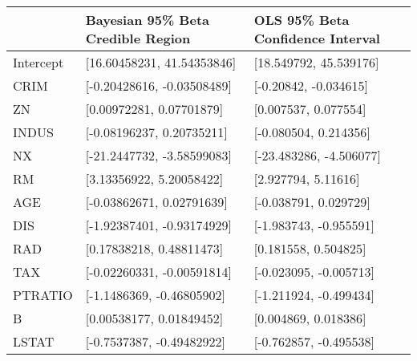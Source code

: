 \begin{tabular}{lll}
\hline
           & Bayesian 95\% Beta Credible Region   & OLS 95\% Beta Confidence Interval   \\
\hline
 Intercept & [16.60458231, 41.54353846]          & [18.549792, 45.539176]             \\
 CRIM      & [-0.20428616, -0.03508489]          & [-0.20842, -0.034615]              \\
 ZN        & [0.00972281, 0.07701879]            & [0.007537, 0.077554]               \\
 INDUS     & [-0.08196237, 0.20735211]           & [-0.080504, 0.214356]              \\
 NX        & [-21.2447732, -3.58599083]          & [-23.483286, -4.506077]            \\
 RM        & [3.13356922, 5.20058422]            & [2.927794, 5.11616]                \\
 AGE       & [-0.03862671, 0.02791639]           & [-0.038791, 0.029729]              \\
 DIS       & [-1.92387401, -0.93174929]          & [-1.983743, -0.955591]             \\
 RAD       & [0.17838218, 0.48811473]            & [0.181558, 0.504825]               \\
 TAX       & [-0.02260331, -0.00591814]          & [-0.023095, -0.005713]             \\
 PTRATIO   & [-1.1486369, -0.46805902]           & [-1.211924, -0.499434]             \\
 B         & [0.00538177, 0.01849452]            & [0.004869, 0.018386]               \\
 LSTAT     & [-0.7537387, -0.49482922]           & [-0.762857, -0.495538]             \\
\hline
\end{tabular}